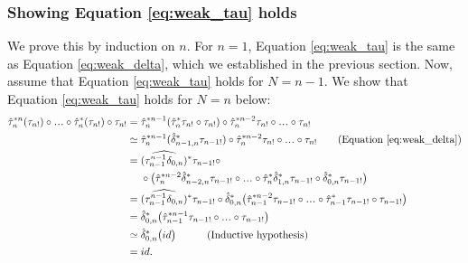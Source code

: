 \subsubsection{Showing Equation \ref{eq:weak_tau} holds}\label{sec:weak_relations_tau}
We prove this by induction on $n$. For $n=1$, 
Equation \ref{eq:weak_tau} is the same as 
Equation \ref{eq:weak_delta}, which we 
established in the previous section. Now, 
assume that Equation \ref{eq:weak_tau} holds 
for $N=n-1$. We show that Equation 
\ref{eq:weak_tau} holds for $N=n$ below:
\begin{align*}
\hat{\tau}_n^{*n}(\tau_{n!}) \circ \smdots 
  \circ \hat{\tau}_n^*(\tau_{n!}) \circ \tau_{n!}
&= 
\hat{\tau}_n^{*n-1}(
  \hat{\tau}_n^*\tau_{n!}\circ \tau_{n!}) \circ
  \hat{\tau}_n^{*n-2}\tau_{n!}\circ
  \smdots \circ \tau_{n!}\\
&\simeq 
\hat{\tau}_n^{*n-1}(
  \hat{\delta}_{n-1,n}^*\tau_{n-1!}) \circ
  \hat{\tau}_n^{*n-2}\tau_{n!}\circ
  \smdots \circ \tau_{n!}
  \quad \quad \textrm{(Equation \ref{eq:weak_delta})}\\ 
&= 
(\widehat{\tau_{n-1}^{n-1}\delta_{0,n}})^*
  \tau_{n-1!} \circ \\
&\phantom{{}={}}  
  \circ \big(
  \hat{\tau}_n^{*n-2} \hat{\delta}_{n-2,n}^*
  \tau_{n-1!}\circ \smdots \circ 
  \hat{\tau}_n^* \hat{\delta}_{1,n}^* \tau_{n-1!} 
  \circ \hat{\delta}_{0,n}^* \tau_{n-1!} 
  \big)\\
&= 
(\widehat{\tau_{n-1}^{n-1}\delta_{0,n}})^*
  \tau_{n-1!} \circ \hat{\delta}_{0,n}^* \big(
  \hat{\tau}_{n-1}^{*n-2} \tau_{n-1!}\circ \smdots \circ 
  \hat{\tau}_{n-1}^* \tau_{n-1!} 
  \circ \tau_{n-1!} \big)  \\
&= 
\hat{\delta}_{0,n}^* \big(
  \hat{\tau}_{n-1}^{*n-1} \tau_{n-1!} \circ 
  \smdots \circ \tau_{n-1!} \big)  \\ 
&\simeq 
\hat{\delta}_{0,n}^* \big(
  id \big)
  \quad \quad \quad 
  \textrm{(Inductive hypothesis)}\\
&= id.
\end{align*}
%

